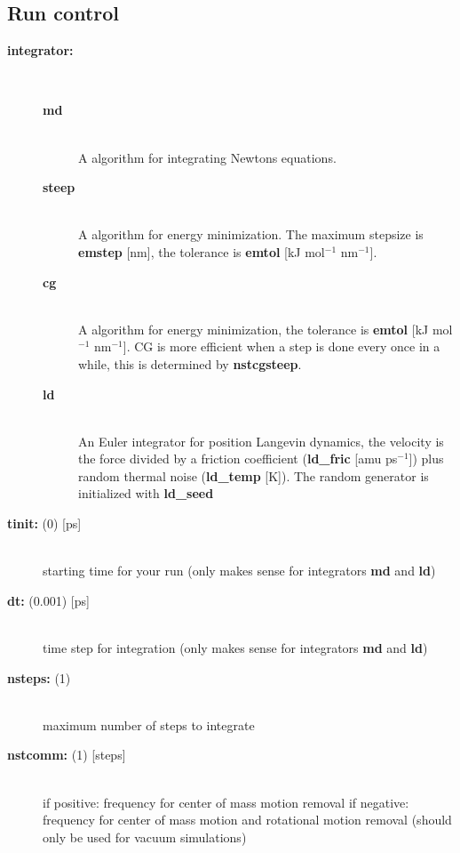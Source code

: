 \subsection{Run control}
\begin{description}
\item[{\bf integrator:}]\mbox{}\\
\vspace{-2ex}\begin{description}
\item[{\bf md} ]\mbox{}\\
A  algorithm for integrating Newtons equations.
\item[{\bf steep}]\mbox{}\\
A  algorithm for energy minimization.
The maximum stepsize is {\bf emstep} [nm], the tolerance is 
{\bf emtol} [kJ mol$^{-1}$ nm$^{-1}$].
\item[{\bf cg}]\mbox{}\\
 A  algorithm for energy minimization,
the tolerance is {\bf emtol} [kJ mol$^{-1}$ nm$^{-1}$]. 
CG is more efficient
when a  step is done every once in a while,
this is determined by {\bf nstcgsteep}.
\item[{\bf ld}]\mbox{}\\
 An Euler integrator for position Langevin dynamics, the
velocity is the force divided by a friction coefficient 
({\bf ld\_fric} [amu ps$^{-1}$])
plus random thermal noise ({\bf ld\_temp} [K]). 
The random generator is initialized with {\bf ld\_seed}
\end{description}
\item[{\bf tinit: }(0) {[ps]}]\mbox{}\\
starting time for your run (only makes sense for integrators {\bf md} 
and {\bf ld})
\item[{\bf dt: }(0.001) {[ps]}]\mbox{}\\
time step for integration (only makes sense for integrators {\bf md} 
and {\bf ld})
\item[{\bf nsteps: }(1)]\mbox{}\\
maximum number of steps to integrate
\item[{\bf nstcomm: }(1) {[steps]}]\mbox{}\\
if positive: frequency for center of mass motion removal
if negative: frequency for center of mass motion and rotational 
motion removal (should only be used for vacuum simulations)
\end{description}


